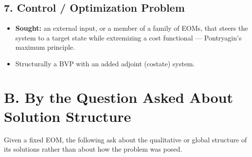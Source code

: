 \documentclass[11pt]{article}
\begin{document}
\subsection*{7. Control / Optimization Problem}
\begin{itemize}[leftmargin=*]
  \item \textbf{Sought:} an external input, or a member of a family of
  EOMs, that steers the system to a target state while extremizing a
  cost functional --- Pontryagin's maximum principle.
  \item Structurally a BVP with an added adjoint (costate) system.
\end{itemize}

\section*{B. By the Question Asked About Solution Structure}

Given a fixed EOM, the following ask about the qualitative or global
structure of its solutions rather than about how the problem was
posed.
\end{document}
